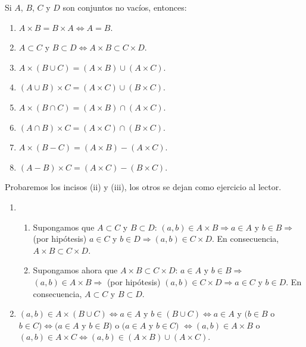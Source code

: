 \begin{prop}{}{}
    Si $A$, $B$, $C$ y $D$ son conjuntos no vacíos, entonces:
    \begin{enumerate}[label=\roman*., topsep=6pt, itemsep=0pt]
        \item $A \times B=B \times A \Longleftrightarrow A=B$.
        \item $A \subset C$ y $B \subset D \Longleftrightarrow A \times B \subset C \times D$.
        \item $A \times(B \cup C)=(A \times B) \cup(A \times C)$.
        \item $(A \cup B) \times C=(A \times C) \cup(B \times C)$.
        \item $A \times(B \cap C)=(A \times B) \cap(A \times C)$.
        \item $(A \cap B) \times C=(A \times C) \cap(B \times C)$.
        \item $A \times(B-C)=(A \times B)-(A \times C)$.
        \item $(A-B) \times C=(A \times C)-(B \times C)$.
    \end{enumerate}
    \tcblower
    \demostracion Probaremos los incisos (ii) y (iii), los otros se dejan como ejercicio al lector.
    \begin{enumerate}[label=\roman*., topsep=6pt, itemsep=0pt,start=2]
        \item
        \begin{enumerate}[label=\alph*)]
            \item Supongamos que $A \subset C$ y $B \subset D$: $(a, b) \in A \times B \Longrightarrow a \in A$ y $b \in B \Longrightarrow$ (por hipótesis) $a \in C$ y $b \in D \Longrightarrow(a, b) \in C \times D$. En consecuencia, $A \times B \subset C \times D$.
            \item Supongamos ahora que $A \times B \subset C \times D$: $a \in A$ y $b \in B \Longrightarrow$ $(a, b) \in A \times B \Longrightarrow$ (por hipótesis) $(a, b) \in C \times D \Longrightarrow a \in C$ y $b \in D$. En consecuencia, $A \subset C$ y $B \subset D$.
        \end{enumerate}
        \item $(a, b) \in A \times(B \cup C) \Longleftrightarrow a \in A$ y $b \in (B \cup C) \Longleftrightarrow a \in A$ y $(b \in B$ o $b \in C) \Longleftrightarrow(a \in A$ y $b \in B)$ o $(a \in A$ y $b \in C)$ $\Longleftrightarrow (a, b) \in A \times B$ o $(a, b) \in A \times C \Longleftrightarrow (a, b) \in(A \times B) \cup(A \times C)$.
    \end{enumerate}
\end{prop}

